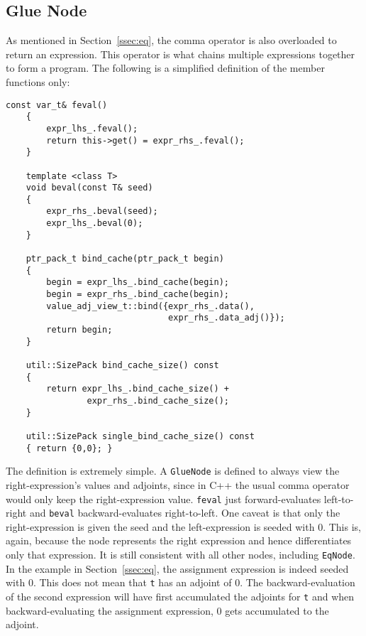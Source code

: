 \subsection{Glue Node}\label{ssec:glue}

As mentioned in Section~\ref{ssec:eq},
the comma operator is also overloaded to return an expression.
This operator is what chains multiple expressions together to form a program.
The following is a simplified definition of the member functions only:
\begin{lstlisting}[style=customcpp]
    const var_t& feval()
    {
        expr_lhs_.feval(); 
        return this->get() = expr_rhs_.feval();
    }

    template <class T>
    void beval(const T& seed)
    {
        expr_rhs_.beval(seed); 
        expr_lhs_.beval(0);
    }

    ptr_pack_t bind_cache(ptr_pack_t begin)
    {
        begin = expr_lhs_.bind_cache(begin);
        begin = expr_rhs_.bind_cache(begin);
        value_adj_view_t::bind({expr_rhs_.data(), 
                                expr_rhs_.data_adj()});
        return begin;
    }

    util::SizePack bind_cache_size() const 
    { 
        return expr_lhs_.bind_cache_size() + 
                expr_rhs_.bind_cache_size();
    }

    util::SizePack single_bind_cache_size() const
    { return {0,0}; }
\end{lstlisting}
The definition is extremely simple.
A \verb|GlueNode| is defined to always view the right-expression's values and adjoints,
since in C++ the usual comma operator would only keep the right-expression value.
\verb|feval| just forward-evaluates left-to-right and \verb|beval| backward-evaluates right-to-left.
One caveat is that only the right-expression is given the seed and the left-expression is seeded with 0.
This is, again, because the node represents the right expression and hence differentiates only that expression.
It is still consistent with all other nodes, including \verb|EqNode|.
In the example in Section~\ref{ssec:eq}, the assignment expression is indeed seeded with 0.
This does not mean that \verb|t| has an adjoint of 0.
The backward-evaluation of the second expression will have first accumulated the adjoints for \verb|t|
and when backward-evaluating the assignment expression, 0 gets accumulated to the adjoint.

